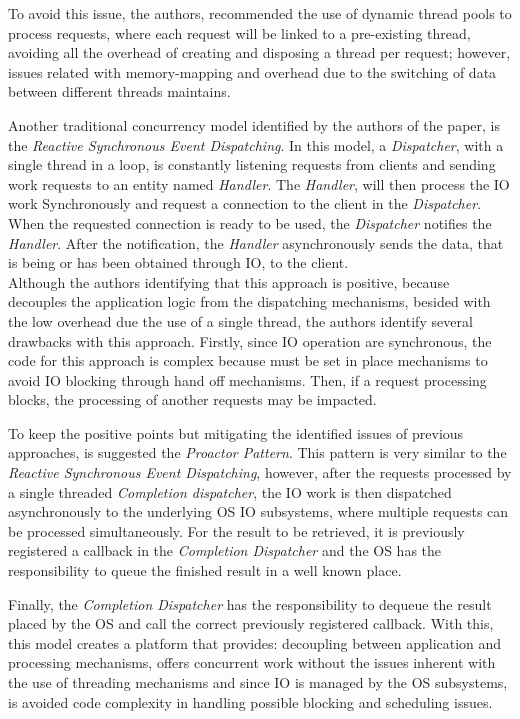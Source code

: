 To avoid this issue, the authors, recommended the use of dynamic thread pools to process requests, where each request will be linked to a pre-existing thread, avoiding all the overhead of creating and disposing a thread per request;
however, issues related with memory-mapping and overhead due to the switching of data between different threads maintains. 

Another traditional concurrency model identified by the authors of the paper, is the \textit{Reactive Synchronous Event Dispatching}. In this model, a \textit{Dispatcher}, with a single thread in a loop, is constantly listening requests from clients and sending work requests to an entity named \textit{Handler}. 
The \textit{Handler}, will then process the IO work Synchronously and request a connection to the client in the \textit{Dispatcher}. When the requested connection is ready to be used, the \textit{Dispatcher} notifies the \textit{Handler}. After the notification, the \textit{Handler} asynchronously sends the data, that is being or has been obtained through IO, to the client.\\
Although the authors identifying that this approach is positive, because decouples the application logic from the dispatching mechanisms, besided with the low overhead due the use of a single thread, the authors identify several drawbacks with this approach. 
Firstly, since IO operation are synchronous, the code for this approach is complex because must be set in place mechanisms to avoid IO blocking through hand off mechanisms. 
Then, if a request processing blocks, the processing of another requests may be impacted. 

To keep the positive points but mitigating the identified issues of previous approaches, is suggested the \textit{Proactor Pattern}. 
This pattern is very similar to the \textit{Reactive Synchronous Event Dispatching}, however, after the requests processed by a single threaded \textit{Completion dispatcher}, 
the IO work is then dispatched asynchronously to the underlying OS IO subsystems, where multiple requests can be processed simultaneously. 
For the result to be retrieved, it is previously registered a callback in the \textit{Completion Dispatcher} and the OS has the responsibility to queue the finished result in a well known place. 

Finally, the \textit{Completion Dispatcher} has the responsibility to dequeue the result placed by the OS and call the correct previously registered callback. 
With this, this model creates a platform that provides: decoupling between application and processing mechanisms,
offers concurrent work without the issues inherent with the use of threading mechanisms and since IO is managed by the OS subsystems, is avoided code complexity in handling possible blocking and scheduling issues.  

